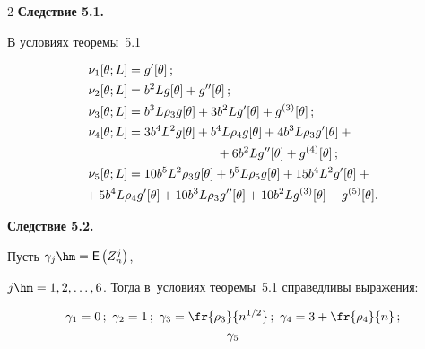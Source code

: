 \begin{multicols}{2}
\textbf{Следствие 5.1.}\


В условиях теоремы~5.1


 \begin{align*}


 \nu_1[\theta;L]&   =g'[\theta]\,;


\\


 \nu_2[\theta;L]&   =b^2 L g[\theta]+g''[\theta]\,;


\\


 \nu_3[\theta;L]&   =b^3 L\rho_3 g[\theta] +3 b^2 L g'[\theta]+g^{(3)}[\theta]\,;


\\


 \nu_4[\theta;L]&   =3 b^4 L^2 g[\theta]+b^4 L\rho_4 g[\theta] +


   4 b^3 L \rho_3 g'[\theta]+{}\\


   &\hspace*{25mm}{}+ 6 b^2 L g''[\theta]+g^{(4)}[\theta]\,;


\\


 \nu_5[\theta;L]&    =10 b^5 L^2\rho_3 g[\theta] +b^5 L\rho_5 g[\theta] +


   15 b^4 L^2 g'[\theta]+{}\\


&   \hspace*{-12.3mm}{}+5 b^4 L \rho_4 g'[\theta] +10 b^3 L \rho_3 g''[\theta]+10 b^2 L g^{(3)}[\theta]+g^{(5)}[\theta].


 \end{align*}








\noindent


\textbf{Следствие 5.2.}\


 Пусть $\gamma_j\hm=\Ep\left(Z_n^j\right)$,


$j\hm=1,2,\ldots,6$. Тогда в~условиях теоремы~5.1 справедливы выражения:


 \begin{gather*}


 \gamma_1=0\,;\ \gamma_2=1\,;\ \gamma_3=\fr{\rho_3}{n^{1/2}}\,;\


 \gamma_4=3+\fr{\rho_4}{n}\,;


\\


 \gamma_5



\end{gather*}
\end{multicols}
